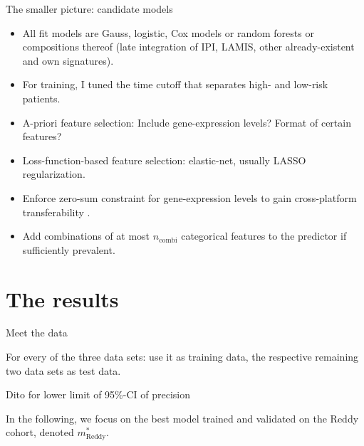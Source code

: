 \documentclass[10pt, aspectratio=169]{beamer}
\begin{document}
\begin{frame}{The smaller picture: candidate models}
  \begin{itemize}
    \item All fit models are Gauss, logistic, Cox models or random forests or compositions thereof 
      (late integration of IPI, LAMIS, other already-existent and own signatures).
    \item For training, I tuned the time cutoff that separates high- and low-risk patients.
    \item A-priori feature selection: Include gene-expression levels? Format of certain features?
    \item Loss-function-based feature selection: elastic-net, usually LASSO regularization.
    \item Enforce zero-sum constraint for gene-expression levels to gain cross-platform 
      transferability \cite{zerosum16,transplatform17}.
    \item Add combinations of at most $n_\text{combi}$ categorical features to the predictor if 
      sufficiently prevalent.
  \end{itemize}
\end{frame}


\section{The results}

\begin{frame}{Meet the data}
  
\end{frame}

\begin{frame}{}
  For every of the three data sets: use it as training data, the respective remaining two data sets 
  as test data.

  
\end{frame}

\begin{frame}{Dito for lower limit of 95\%-CI of precision}
  
  
  In the following, we focus on the best model trained and validated on the Reddy cohort, denoted 
  $m_\text{Reddy}^*$.
\end{frame}
\end{document}
